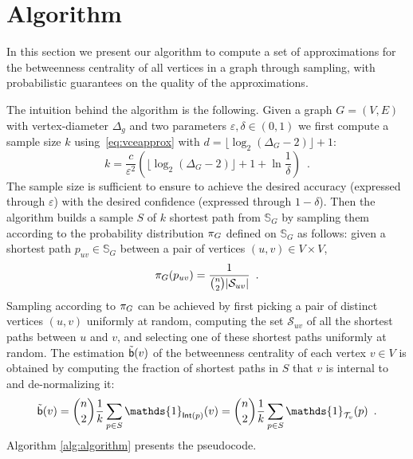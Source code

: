 \section{Algorithm}\label{sec:algo}
In this section we present our algorithm to compute a set of approximations for the
betweenness centrality of all vertices in a graph through sampling, with
probabilistic guarantees on the quality of the approximations.

The intuition behind the algorithm is the following. Given a graph $G=(V,E)$
with vertex-diameter $\Delta_g$ and two parameters $\varepsilon,\delta\in(0,1)$ we first compute a sample
size $k$ using~\eqref{eq:vceapprox} with
$d=\lfloor\log_2(\Delta_G-2)\rfloor+1$:
\begin{equation}\label{eq:samplesize}
k=\frac{c}{\varepsilon^2}\left(\lfloor\log_2(\Delta_G-2)\rfloor+1+\ln\frac{1}{\delta}\right)\enspace.
\end{equation}
The sample size is sufficient to ensure
to achieve the desired accuracy (expressed through $\varepsilon$) with the
desired confidence (expressed through $1-\delta$). Then the algorithm builds a
sample $S$ of $k$ shortest path from $\mathbb{S}_G$ by sampling them according to
the probability distribution $\pi_G$ defined on $\mathbb{S}_G$ as follows:
given a shortest path $p_{uv}\in\mathbb{S}_G$ between a pair of vertices
$(u,v)\in V\times V$, 
\[
\prob_G(p_{uv})=\frac{1}{\binom{n}{2}|\mathcal{S}_{uv}|}\enspace.%
\]
Sampling according to $\pi_G$ can be achieved by first picking a pair of distinct vertices $(u,v)$
uniformly at random, computing the set $\mathcal{S}_{uv}$ of all the shortest
paths between $u$ and $v$, and selecting one of these shortest paths uniformly
at random. The estimation $\tilde{\mathsf{b}}(v)$ of the betweenness centrality of each
vertex $v\in V$ is obtained by computing the fraction of shortest paths in $S$
that $v$ is internal to and de-normalizing it: 
\[
\tilde\betw(v) = \binom{n}{2}\frac{1}{k}\sum_{p\in S}
\mathds{1}_{\mathsf{Int}(p)}(v) = \binom{n}{2}\frac{1}{k}\sum_{p\in S}
\mathds{1}_{\mathcal{T}_v}(p)\enspace.
\]
Algorithm \ref{alg:algorithm} presents the pseudocode.
